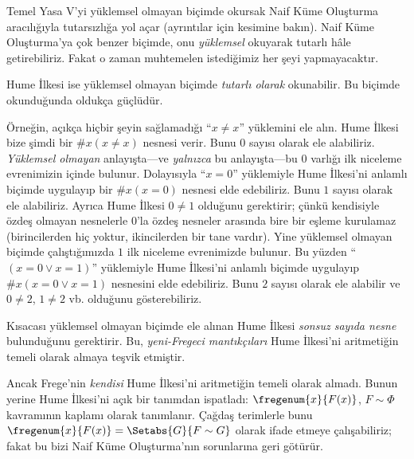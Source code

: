 \documentclass[../../../include/open-logic-section]{subfiles}
\begin{document}
Temel Yasa V'yi yüklemsel olmayan biçimde okursak Naif Küme Oluşturma
aracılığıyla tutarsızlığa yol açar (ayrıntılar için
 kesimine bakın). Naif Küme Oluşturma'ya çok benzer
biçimde, onu \emph{yüklemsel} okuyarak tutarlı hâle getirebiliriz. Fakat o
zaman muhtemelen istediğimiz her şeyi yapmayacaktır.

Hume İlkesi ise yüklemsel olmayan biçimde \emph{tutarlı olarak} okunabilir.
Bu biçimde okunduğunda oldukça güçlüdür.

Örneğin, açıkça hiçbir şeyin sağlamadığı ``$x\neq x$'' yüklemini ele alın.
Hume İlkesi bize şimdi bir $\#x(x\neq x)$ nesnesi verir. Bunu $0$ sayısı
olarak ele alabiliriz. \emph{Yüklemsel olmayan} anlayışta---ve
\emph{yalnızca} bu anlayışta---bu $0$ varlığı ilk niceleme evrenimizin
içinde bulunur. Dolayısıyla ``$x=0$'' yüklemiyle Hume İlkesi'ni anlamlı
biçimde uygulayıp bir $\#x(x=0)$ nesnesi elde edebiliriz. Bunu $1$ sayısı
olarak ele alabiliriz. Ayrıca Hume İlkesi $0\neq1$ olduğunu gerektirir;
çünkü kendisiyle özdeş olmayan nesnelerle $0$'la özdeş nesneler arasında
bire bir eşleme kurulamaz (birincilerden hiç yoktur, ikincilerden bir tane
vardır). Yine yüklemsel olmayan biçimde çalıştığımızda $1$ ilk niceleme
evrenimizde bulunur. Bu yüzden ``$(x=0\lor x=1)$'' yüklemiyle Hume
İlkesi'ni anlamlı biçimde uygulayıp $\#x(x=0\lor x=1)$ nesnesini elde
edebiliriz. Bunu $2$ sayısı olarak ele alabilir ve $0\neq2$, $1\neq2$ vb.
olduğunu gösterebiliriz.

Kısacası yüklemsel olmayan biçimde ele alınan Hume İlkesi \emph{sonsuz
sayıda nesne} bulunduğunu gerektirir. Bu, \emph{yeni-Fregeci
mantıkçıları} Hume İlkesi'ni aritmetiğin temeli olarak almaya teşvik
etmiştir.

Ancak Frege'nin \emph{kendisi} Hume İlkesi'ni aritmetiğin temeli olarak
almadı. Bunun yerine Hume İlkesi'ni açık bir tanımdan ispatladı:
$\fregenum{x}{F(x)}$, $F\sim\Phi$ kavramının kaplamı olarak tanımlanır.
Çağdaş terimlerle bunu
$\fregenum{x}{F(x)}=\Setabs{G}{F\sim G}$ olarak ifade etmeye çalışabiliriz;
fakat bu bizi Naif Küme Oluşturma'nın sorunlarına geri götürür.
\end{document}
